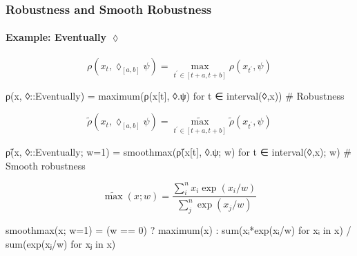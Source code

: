\begin{frame}[fragile,t]
\frametitle{Robustness and Smooth Robustness}
\framesubtitle{Example: Eventually $\lozenge$}

\pause
\begin{scriptsize}
\begin{equation*}
    \rho(x_t, \lozenge_{[a,b]}\psi) = \max_{t^\prime \in [t+a,t+b]} \rho(x_{t^\prime}, \psi)
\end{equation*}
\end{scriptsize}
\vspace{-0.5\baselineskip}
\pause
{\fontsize{8}{10}\selectfont
\begin{algorithmblock}
\begin{juliaverbatim}
ρ(x, ◊::Eventually) = maximum(ρ(x[t], ◊.ψ) for t ∈ interval(◊,x)) # Robustness
\end{juliaverbatim}
\end{algorithmblock}}

\vspace{\baselineskip}

\pause
\begin{scriptsize}
\begin{equation*}
    \tilde{\rho}(x_t, \lozenge_{[a,b]}\psi) = \operatorname*{\widetilde{\max}}_{t^\prime \in [t+a,t+b]} \tilde{\rho}(x_{t^\prime}, \psi)
\end{equation*}
\end{scriptsize}
\vspace{-0.5\baselineskip}
\pause
{\fontsize{8}{10}\selectfont
\begin{algorithmblock}
\begin{juliaverbatim}
ρ̃(x, ◊::Eventually; w=1) = smoothmax(ρ̃(x[t], ◊.ψ; w) for t ∈ interval(◊,x); w) # Smooth robustness
\end{juliaverbatim}
\end{algorithmblock}}

\vspace{\baselineskip}

\pause
\begin{scriptsize}
\begin{equation*}
    \widetilde{\max}(x; w) = \frac{\sum_i^n x_i \exp(x_i/w)}{\sum_j^n \exp(x_j/w)}
\end{equation*}
\end{scriptsize}
\vspace{-0.5\baselineskip}
\pause
{\fontsize{8}{10}\selectfont
\begin{algorithmblock}
\begin{juliaverbatim}
smoothmax(x; w=1) = (w == 0) ? maximum(x) : sum(xᵢ*exp(xᵢ/w) for xᵢ in x) / sum(exp(xⱼ/w) for xⱼ in x)
\end{juliaverbatim}
\end{algorithmblock}}

\vspace{\baselineskip}

\end{frame}

